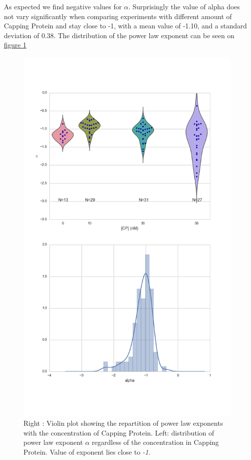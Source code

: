 \documentclass[A4paperpaper,11pt,english]{sphinxmanual}
\begin{document}
As expected we find negative values for \(\alpha\). Surprisingly the value
of alpha does not vary significantly when comparing experiments with different
amount of Capping Protein and stay close to -1, with a mean value of -1.10, and
a standard deviation of 0.38. The distribution of the power law exponent can be
seen on \hyperref[index-latex:power-law-exponent]{figure  \ref*{index-latex:power-law-exponent}}
\begin{figure}[htbp]
\centering
\capstart

\includegraphics[width=0.600\linewidth]{alpha_violin.png}
\caption{Right : Violin plot showing the repartition of power law exponents with the
concentration of Capping Protein. Left: distribution of power law exponent
\(\alpha\) regardless of the concentration in Capping Protein. Value of
exponent lies close to \emph{-1}.}\label{index-latex:power-law-exponent}\end{figure}
\end{document}

